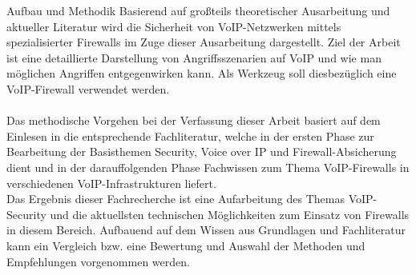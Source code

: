 \begin{section}{Aufbau und Methodik}
Basierend auf großteils theoretischer Ausarbeitung und aktueller Literatur wird die Sicherheit von VoIP-Netzwerken mittels spezialisierter Firewalls im Zuge dieser Ausarbeitung dargestellt.
Ziel der Arbeit ist eine detaillierte Darstellung von Angriffsszenarien auf VoIP und wie man möglichen Angriffen entgegenwirken kann. Als Werkzeug soll diesbezüglich eine VoIP-Firewall verwendet werden. 
\\ \\
Das methodische Vorgehen bei der Verfassung dieser Arbeit basiert auf dem Einlesen in die entsprechende Fachliteratur, welche in der ersten Phase zur Bearbeitung der Basisthemen Security, Voice over IP und Firewall-Absicherung dient und in der darauffolgenden Phase Fachwissen zum Thema VoIP-Firewalls in verschiedenen VoIP-Infrastrukturen liefert.
\\
Das Ergebnis dieser Fachrecherche ist eine Aufarbeitung des Themas VoIP-Security und die aktuellsten technischen Möglichkeiten zum Einsatz von Firewalls in diesem Bereich. 
Aufbauend auf dem Wissen aus Grundlagen und Fachliteratur kann ein Vergleich bzw. eine Bewertung und Auswahl der Methoden und Empfehlungen vorgenommen werden. 
\end{section}
\pagebreak

